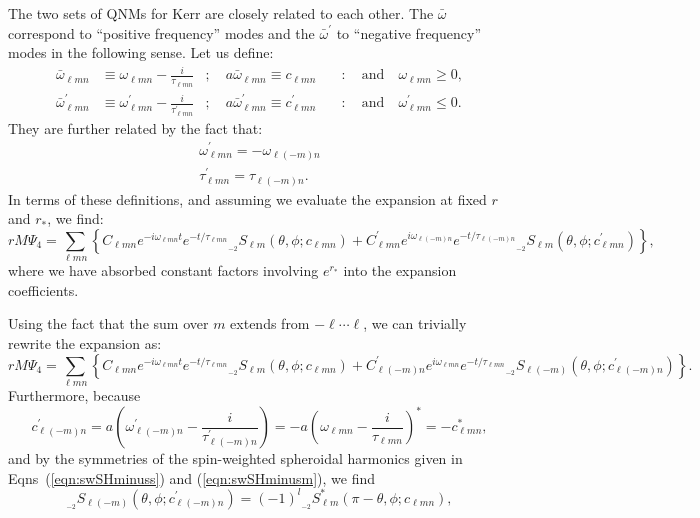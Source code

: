 \documentclass[11pt]{article}
\newcommand{\swSH}[5][]{{}_{{}_{#2}}S^{#1}_{#3}(#4;#5)}
\begin{document}
The two sets of QNMs for Kerr are closely related to each other.  The $\bar\omega$ correspond to ``positive frequency'' modes and the $\bar\omega^\prime$ to ``negative frequency'' modes in the following sense.  Let us define:
\begin{align}
    \bar\omega_{\ell{m}n} &\equiv 
    \omega_{\ell{m}n} - \frac{i}{\tau_{\ell{m}n}}
      &;\quad a\bar\omega_{\ell{m}n}\equiv c_{\ell{m}n}
    &\quad:\quad\mbox{and}\quad \omega_{\ell{m}n} \ge 0, \\
    \bar\omega^\prime_{\ell{m}n} &\equiv 
    \omega^\prime_{\ell{m}n} - \frac{i}{\tau^\prime_{\ell{m}n}}
      &;\quad a\bar\omega^\prime_{\ell{m}n}\equiv c^\prime_{\ell{m}n}
    &\quad:\quad\mbox{and}\quad \omega^\prime_{\ell{m}n} \le 0.
\end{align}
They are further related by the fact that:
\begin{align}
\omega^\prime_{\ell{m}n} = -\omega_{\ell(-m)n} \\
\tau^\prime_{\ell{m}n} = \tau_{\ell(-m)n}.
\end{align} 
In terms of these definitions, and assuming we evaluate the expansion at fixed $r$ and $r_*$, we find:
\begin{equation}
rM\Psi_4 = \sum_{\ell{m}n} \left\{ C_{\ell{m}n} e^{-i\omega_{\ell{m}n}t}e^{-t/\tau_{\ell{m}n}} \swSH{\minus 2}{\ell{m}}{\theta,\phi}{c_{\ell{m}n}} + C^\prime_{\ell{m}n} e^{i\omega_{\ell(-m)n}}e^{-t/\tau_{\ell(-m)n}} \swSH{\minus 2}{\ell{m}}{\theta,\phi}{c^\prime_{\ell{m}n}} \right\},
\end{equation}
where we have absorbed constant factors involving $e^{r_*}$ into the
expansion coefficients.

Using the fact that the sum over $m$ extends from $-\ell\cdots\ell$, we can trivially rewrite the expansion as:
\begin{equation}
rM\Psi_4 = \sum_{\ell{m}n} \left\{ C_{\ell{m}n} e^{-i\omega_{\ell{m}n}t}e^{-t/\tau_{\ell{m}n}} \swSH{\minus 2}{\ell{m}}{\theta,\phi}{c_{\ell{m}n}} + C^\prime_{\ell(-m)n} e^{i\omega_{\ell{m}n}}e^{-t/\tau_{\ell{m}n}} \swSH{\minus 2}{\ell(-m)}{\theta,\phi}{c^\prime_{\ell(-m)n}} \right\}.
\end{equation}
Furthermore, because
\begin{equation}
c^\prime_{\ell(-m)n} = a\left(\omega^\prime_{\ell(-m)n} 
               - \frac{i}{\tau^\prime_{\ell(-m)n}}\right) =
               -a\left(\omega_{\ell{m}n} 
               - \frac{i}{\tau_{\ell{m}n}}\right)^* = -c^*_{\ell{m}n},
\end{equation}
and by the symmetries of the spin-weighted spheroidal harmonics given in Eqns~(\ref{eqn:swSHminuss}) and (\ref{eqn:swSHminusm}), we find
\begin{equation}
\swSH{\minus 2}{\ell(-m)}{\theta,\phi}{c^\prime_{\ell(-m)n}} = (-1)^l \swSH[*]{\minus 2}{\ell{m}}{\pi-\theta,\phi}{c_{\ell{m}n}},
\end{equation}
\end{document}
